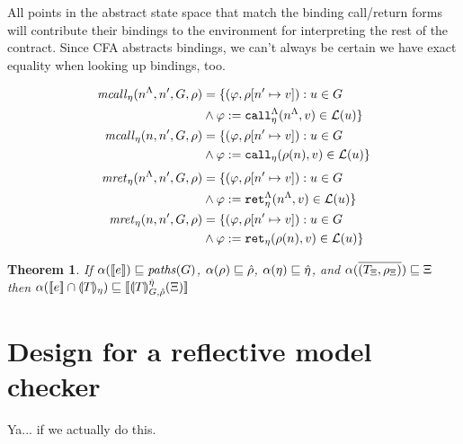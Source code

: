 \documentclass[preprint,onecolumn,9pt]{sigplanconf} %
\newtheorem{theorem}{Theorem}
\begin{document}
All points in the abstract state space that match the binding call/return forms will contribute their bindings to the environment for interpreting the rest of the contract.
%
Since CFA abstracts bindings, we can't always be certain we have exact equality when looking up bindings, too.

\begin{align*}
  \matchcall_\mtimeline(\mtoplevelname, \mname', \mgraph, \menv) &=
    \setbuild{(\ltlprop, \menv[\mname' \mapsto \mval])}
             {\mnode \in \mgraph\\
               &\wedge \ltlprop:=\aptopcall{\mtoplevelname}{\mval}{\mtimeline} \in \labelof(\mnode)}
\\
  \matchcall_\mtimeline(\mname, \mname', \mgraph, \menv) &=
    \setbuild{(\ltlprop, \menv[\mname' \mapsto \mval])}
             {\mnode \in \mgraph\\
               &\wedge \ltlprop:=\apvcall{\menv(\mname)}{\mval}{\mtimeline} \in \labelof(\mnode)}
%
\\[2pt]
  \matchret_\mtimeline(\mtoplevelname, \mname', \mgraph, \menv) &=
    \setbuild{(\ltlprop, \menv[\mname' \mapsto \mval])}
             {\mnode \in \mgraph\\
               &\wedge \ltlprop:=\aptopret{\mtoplevelname}{\mval}{\mtimeline} \in \labelof(\mnode)}
\\
  \matchret_\mtimeline(\mname, \mname', \mgraph, \menv) &=
    \setbuild{(\ltlprop, \menv[\mname' \mapsto \mval])}
             {\mnode \in \mgraph\\
               &\wedge \ltlprop:=\apvret{\menv(\mname)}{\mval}{\mtimeline} \in \labelof(\mnode)}
\end{align*}

\begin{theorem}
  If $\alpha([\![ e ]\!]) \sqsubseteq \mathit{paths}(G)$,
     $\alpha(\rho) \sqsubseteq \hat{\rho}$,
     $\alpha(\eta) \sqsubseteq \hat{\eta}$, and
     $\alpha(\overline{(T_\Xi, \rho_\Xi)}) \sqsubseteq \Xi$
  then
  $\alpha([\![ e ]\!] \cap \llparenthesis T \rrparenthesis_{\eta}) \sqsubseteq [\![ \llparenthesis T \rrparenthesis_{G,\hat{\rho}}^{\hat{\eta}}(\Xi) ]\!]$
\end{theorem}

\section{Design for a reflective model checker}

Ya... if we actually do this.
\end{document}
